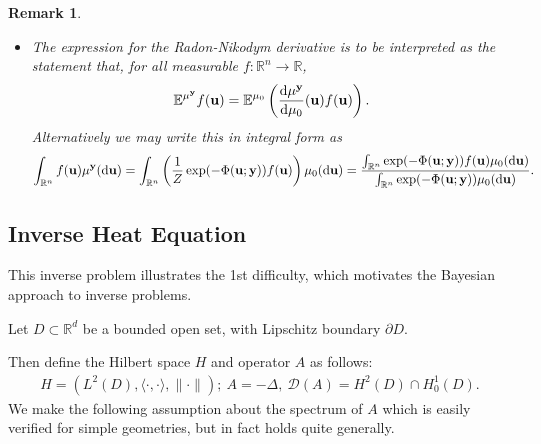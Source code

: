 \documentclass[oneside,11pt]{book}
\numberwithin{equation}{section}
\newtheorem{remark}{Remark}[section]
\begin{document}
\begin{remark}
\begin{itemize}
        This is rewriting Bayes' formula in the form
        \begin{align*}
            \frac{1}{\mathbb{P}({\bf u})}\mathbb{P}({\bf u}|{\bf y}) = \frac{1}{\mathbb{P}({\bf y})}\mathbb{P}({\bf y}|{\bf u}).
        \end{align*}
        \item The expression for the Radon-Nikodym derivative is to be interpreted as the statement that, for all measurable $f:\mathbb{R}^n\to\mathbb{R}$,
        \begin{align*}
            \mathbb{E}^{\mu^{\bf y}}f({\bf u}) = \mathbb{E}^{\mu_0}\left(\frac{{\rm d}\mu^{\bf y}}{{\rm d}\mu_0}({\bf u})f({\bf u})\right).
        \end{align*}
        Alternatively we may write this in integral form as
        \begin{align*}
            \int_{\mathbb{R}^n} f({\bf u})\mu^{\bf y}({\rm d}{\bf u}) = \int_{\mathbb{R}^n} \left(\frac{1}{Z}\exp(-\Phi({\bf u};{\bf y}))f({\bf u})\right)\mu_0({\rm d}{\bf u}) = \frac{\int_{\mathbb{R}^n} \exp(-\Phi({\bf u};{\bf y}))f({\bf u})\mu_0({\rm d}{\bf u})}{\int_{\mathbb{R}^n} \exp(-\Phi({\bf u};{\bf y}))\mu_0({\rm d}{\bf u})}.
        \end{align*}
    \end{itemize}
\end{remark}

\subsection{Inverse Heat Equation}
This inverse problem illustrates the 1st difficulty, which motivates the Bayesian approach to inverse problems.

Let $D\subset\mathbb{R}^d$ be a bounded open set, with Lipschitz boundary $\partial D$.

Then define the Hilbert space $H$ and operator $A$ as follows:
\begin{align*}
    H = (L^2(D),\langle\cdot,\cdot\rangle,\|\cdot\|);\ A = -\Delta,\ \mathcal{D}(A) = H^2(D)\cap H_0^1(D).
\end{align*}
We make the following assumption about the spectrum of $A$ which is easily verified for simple geometries, but in fact holds quite generally.
\end{document}
